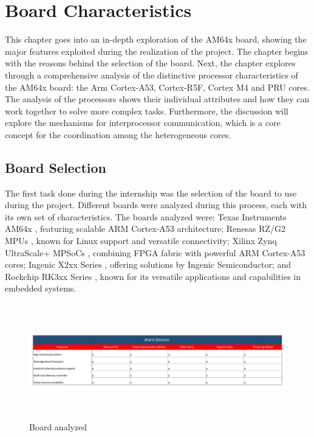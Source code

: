 

\chapter{Board Characteristics}

This chapter goes into an in-depth exploration of the AM64x board, showing the
major features exploited during the realization of the project.
The chapter begins with the reasons behind the selection of the board.
Next, the chapter explores through a comprehensive analysis of the
distinctive processor characteristics of the AM64x board: the Arm Cortex-A53,
Cortex-R5F, Cortex M4 and PRU cores. The analysis of the processors shows their
individual attributes and how they can work together to solve more complex
tasks.
Furthermore, the discussion will explore the mechanisms for interprocessor
communication, which is a core concept for the coordination among the
heterogeneous cores.

\section{Board Selection}

The first task done during the internship was the selection of the board to use
during the project.
Different boards were analyzed during this process, each with its own set of
characteristics.
The boards analyzed were: Texas Instruments AM64x \cite{TI_site}, featuring scalable ARM Cortex-A53 architecture; Renesas RZ/G2 MPUs \cite{Renesas_site}, known for Linux support and versatile connectivity; Xilinx Zynq UltraScale+ MPSoCs \cite{Xilinx_site}, combining FPGA fabric with powerful ARM Cortex-A53 cores; Ingenic X2xx Series \cite{Ingenic_site}, offering solutions by Ingenic Semiconductor; and Rockchip RK3xx Series \cite{Rockchip_site}, known for its versatile applications and capabilities in embedded systems.

\begin{figure}
    \centering
    \includegraphics[height=5cm, width=1.0\textwidth]{Figures/board_selection.jpg}
    \caption{Board analyzed}
\end{figure}


